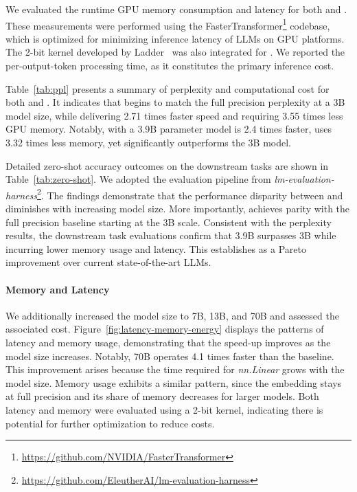 We evaluated the runtime GPU memory consumption and latency for both  and . These measurements were performed using the FasterTransformer\footnote{\url{https://github.com/NVIDIA/FasterTransformer}} codebase, which is optimized for minimizing inference latency of LLMs on GPU platforms. The 2-bit kernel developed by Ladder~\cite{ladder} was also integrated for . We reported the per-output-token processing time, as it constitutes the primary inference cost.

Table~\ref{tab:ppl} presents a summary of perplexity and computational cost for both  and . It indicates that  begins to match the full precision  perplexity at a 3B model size, while delivering 2.71 times faster speed and requiring 3.55 times less GPU memory. Notably,  with a 3.9B parameter model is 2.4 times faster, uses 3.32 times less memory, yet significantly outperforms the  3B model.

Detailed zero-shot accuracy outcomes on the downstream tasks are shown in Table~\ref{tab:zero-shot}. We adopted the evaluation pipeline from \emph{lm-evaluation-harness}\footnote{\url{https://github.com/EleutherAI/lm-evaluation-harness}}. The findings demonstrate that the performance disparity between  and  diminishes with increasing model size. More importantly,  achieves parity with the full precision baseline starting at the 3B scale. Consistent with the perplexity results, the downstream task evaluations confirm that  3.9B surpasses  3B while incurring lower memory usage and latency. This establishes  as a Pareto improvement over current state-of-the-art LLMs.

\paragraph{Memory and Latency}

We additionally increased the model size to 7B, 13B, and 70B and assessed the associated cost. Figure~\ref{fig:latency-memory-energy} displays the patterns of latency and memory usage, demonstrating that the speed-up improves as the model size increases. Notably,  70B operates 4.1 times faster than the  baseline. This improvement arises because the time required for \emph{nn.Linear} grows with the model size. Memory usage exhibits a similar pattern, since the embedding stays at full precision and its share of memory decreases for larger models. Both latency and memory were evaluated using a 2-bit kernel, indicating there is potential for further optimization to reduce costs.

